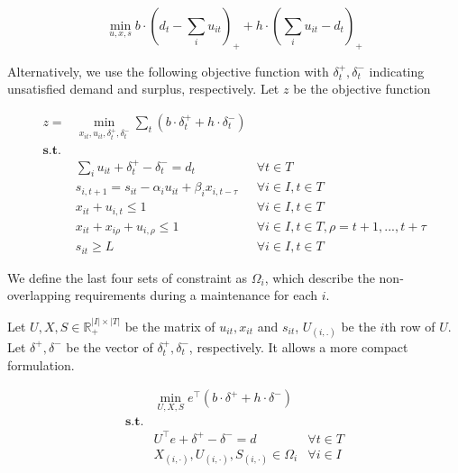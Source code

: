 \documentclass[
  a4paper,
,tablecaptionabove
]{scrartcl}
\numberwithin{equation}{section}
\begin{document}
\[\min_{u,x,s} b \cdot (d_t - \sum_i u_{it})_+ + h \cdot  ( \sum_i u_{it} - d_t)_+ \]

Alternatively, we use the following objective function with
\(\delta^+_t, \delta^-_t\) indicating unsatisfied demand and surplus,
respectively. Let \(z\) be the objective function

\[\begin{aligned}
  z = &\min_{x_{it}, u_{it}, \delta_t^+, \delta_t^-} \sum_t (b\cdot  \delta_t^+ + h \cdot \delta_t^-)\\
  \mathbf{s.t.}  & \\
  &  \sum_i u_{it} + \delta_t^+ - \delta_t^- = d_t& \forall t \in T \\
  &  s_{i, t+1} =  s_{i t}  - \alpha_i  u_{it} + \beta_i  x_{i, t- \tau} & \forall i \in I, t \in T\\
  &  x_{it} +  u_{i, t} \le 1& \forall i \in I, t \in T\\
  &  x_{it} + x_{i\rho} + u_{i, \rho} \le 1& \forall i \in I,  t\in T, \rho = t + 1, ..., t+\tau \\
  &   s_{i t} \ge L& \forall i \in I, t \in T 
\end{aligned}\]

We define the last four sets of constraint as \(\Omega_i\), which
describe the non-overlapping requirements during a maintenance for each
\(i\).

Let \(U, X, S \in \mathbb R^{|I|\times |T|}_+\) be the matrix of
\(u_{it}, x_{it}\) and \(s_{it}\), \(U_{(i,.)}\) be the \(i\)th row of
\(U\). Let \(\delta^+, \delta^-\) be the vector of
\(\delta_t^+, \delta_t^-\), respectively. It allows a more compact
formulation.

\[\begin{aligned}
  & \min_{U, X, S}  e^\top (b\cdot  \delta^+ + h \cdot \delta^-)\\
  \mathbf{s.t.}  & \\
  &  U^\top e + \delta^+ - \delta^- = d& \forall t \in T \\
  & X_{(i,\cdot)}, U_{(i,\cdot)}, S_{(i,\cdot)} \in \Omega_i & \forall i \in I 
\end{aligned}\]
\end{document}

